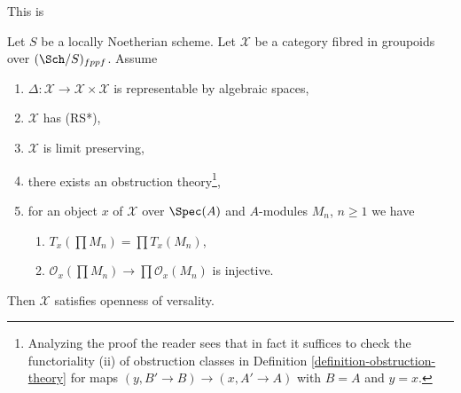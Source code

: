 \begin{lemma}
\label{lemma-get-openness-obstruction-theory}
\begin{reference}
This is \cite[Theorem 4.4]{Hall-coherent}
\end{reference}
Let $S$ be a locally Noetherian scheme. Let $\mathcal{X}$ be a category fibred
in groupoids over $(\Sch/S)_{fppf}$. Assume
\begin{enumerate}
\item $\Delta : \mathcal{X} \to \mathcal{X} \times \mathcal{X}$ is
representable by algebraic spaces,
\item $\mathcal{X}$ has (RS*),
\item $\mathcal{X}$ is limit preserving,
\item there exists an obstruction theory\footnote{Analyzing the proof
the reader sees that in fact it suffices to check
the functoriality (ii) of obstruction classes in
Definition \ref{definition-obstruction-theory}
for maps $(y, B' \to B) \to (x, A' \to A)$
with $B = A$ and $y = x$.},
\item for an object $x$ of $\mathcal{X}$ over $\Spec(A)$
and $A$-modules $M_n$, $n \geq 1$ we have
\begin{enumerate}
\item $T_x(\prod M_n) = \prod T_x(M_n)$,
\item $\mathcal{O}_x(\prod M_n) \to \prod \mathcal{O}_x(M_n)$
is injective.
\end{enumerate}
\end{enumerate}
Then $\mathcal{X}$ satisfies openness of versality.
\end{lemma}

